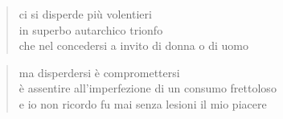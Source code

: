 \clearpage


	\begin{verse}
		ci si disperde più volentieri\\
		in superbo autarchico trionfo\\
		che nel concedersi a invito di donna o di uomo
	\end{verse}

	\begin{verse}
		ma disperdersi è compromettersi\\
		è assentire all'imperfezione di un consumo frettoloso\\
		e io non ricordo fu mai senza lesioni il mio piacere
	\end{verse}

\clearpage


